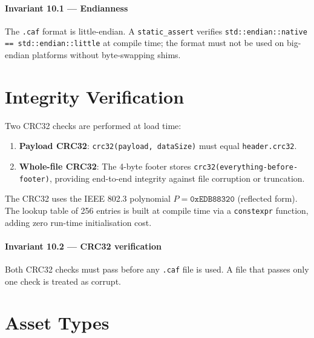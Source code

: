 \paragraph{Invariant 10.1 --- Endianness}

  The \texttt{.caf} format is little-endian.
  A \texttt{static\_assert} verifies \texttt{std::endian::native == std::endian::little}
  at compile time; the format must not be used on big-endian platforms
  without byte-swapping shims.



\section{Integrity Verification}

Two CRC32 checks are performed at load time:
\begin{enumerate}
  \item \textbf{Payload CRC32}: \texttt{crc32(payload, dataSize)} must equal
        \texttt{header.crc32}.
  \item \textbf{Whole-file CRC32}: The 4-byte footer stores
        \texttt{crc32(everything-before-footer)}, providing end-to-end
        integrity against file corruption or truncation.
\end{enumerate}

The CRC32 uses the IEEE 802.3 polynomial $P = \texttt{0xEDB88320}$
(reflected form). The lookup table of 256 entries is built at
compile time via a \texttt{constexpr} function, adding zero run-time
initialisation cost.


\paragraph{Invariant 10.2 --- CRC32 verification}

  Both CRC32 checks must pass before any \texttt{.caf} file is used.
  A file that passes only one check is treated as corrupt.



\section{Asset Types}

